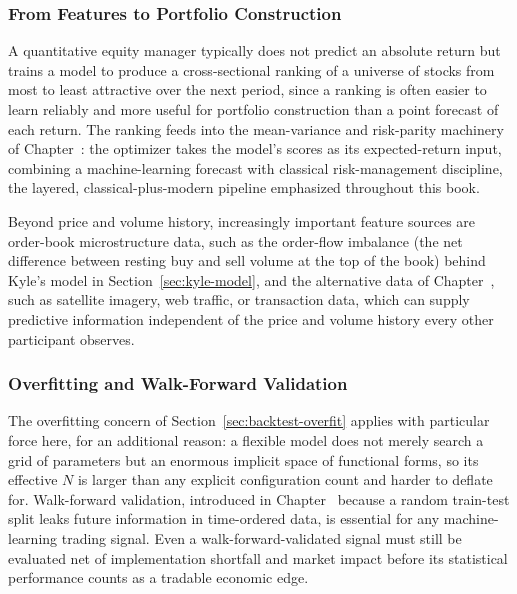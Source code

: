 \documentclass[../ai_in_finance]{subfiles}
\begin{document}
\subsubsection*{From Features to Portfolio Construction}

A quantitative equity manager typically does not predict an absolute return but trains a model to produce a cross-sectional ranking of a universe of stocks from most to least attractive over the next period, since a ranking is often easier to learn reliably and more useful for portfolio construction than a point forecast of each return. The ranking feeds into the mean-variance and risk-parity machinery of Chapter~: the optimizer takes the model's scores as its expected-return input, combining a machine-learning forecast with classical risk-management discipline, the layered, classical-plus-modern pipeline emphasized throughout this book.

Beyond price and volume history, increasingly important feature sources are order-book microstructure data, such as the order-flow imbalance (the net difference between resting buy and sell volume at the top of the book) behind Kyle's model in Section~\ref{sec:kyle-model}, and the alternative data of Chapter~, such as satellite imagery, web traffic, or transaction data, which can supply predictive information independent of the price and volume history every other participant observes.

\subsubsection*{Overfitting and Walk-Forward Validation}

The overfitting concern of Section~\ref{sec:backtest-overfit} applies with particular force here, for an additional reason: a flexible model does not merely search a grid of parameters but an enormous implicit space of functional forms, so its effective $N$ is larger than any explicit configuration count and harder to deflate for. Walk-forward validation, introduced in Chapter~ because a random train-test split leaks future information in time-ordered data, is essential for any machine-learning trading signal. Even a walk-forward-validated signal must still be evaluated net of implementation shortfall and market impact before its statistical performance counts as a tradable economic edge.
\end{document}
